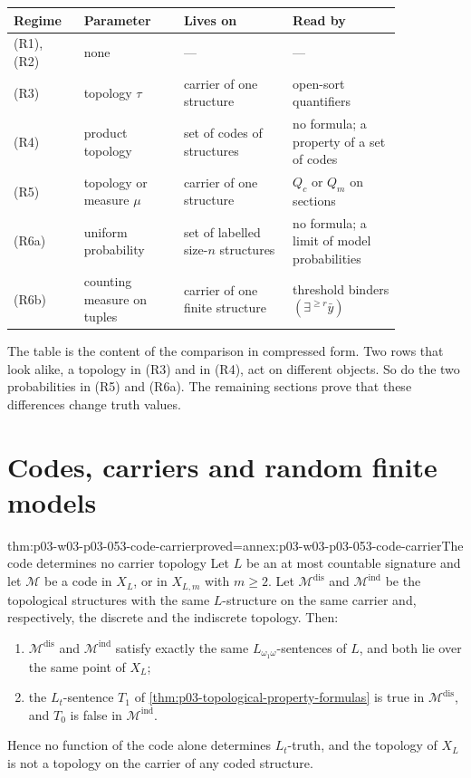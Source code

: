 \begin{center}
\small
\begin{tabular}{@{}p{0.15\linewidth}p{0.22\linewidth}p{0.24\linewidth}p{0.24\linewidth}@{}}
\hline
Regime & Parameter & Lives on & Read by \\
\hline
(R1), (R2) & none & --- & --- \\
(R3) & topology \(\tau\) & carrier of one structure & open-sort quantifiers \\
(R4) & product topology & set of codes of structures & no formula; a property of a set of codes \\
(R5) & topology or measure \(\mu\) & carrier of one structure & \(Q_c\) or \(Q_m\) on sections \\
(R6a) & uniform probability & set of labelled size-\(n\) structures & no formula; a limit of model probabilities \\
(R6b) & counting measure on tuples & carrier of one finite structure & threshold binders \((\exists^{\ge r}\bar y)\) \\
\hline
\end{tabular}
\end{center}

The table is the content of the comparison in compressed form. Two
rows that look alike, a topology in (R3) and in (R4), act on different
objects. So do the two probabilities in (R5) and (R6a).
The remaining sections prove that these differences change truth values.

\section{Codes, carriers and random finite models}
\label{sec:p03-w03-p03-053-codes-carriers}

\begin{hbtheorem}{thm:p03-w03-p03-053-code-carrier}{proved=annex:p03-w03-p03-053-code-carrier}{The code determines no carrier topology}
Let \(L\) be an at most countable signature and let \(\mathcal M\) be a
code in \(X_L\), or in \(X_{L,m}\) with \(m\ge2\). Let
\(\mathcal M^{\mathrm{dis}}\) and \(\mathcal M^{\mathrm{ind}}\) be the
topological structures with the same \(L\)-structure on the same
carrier and, respectively, the discrete and the indiscrete topology.
Then:
\begin{enumerate}
\item \(\mathcal M^{\mathrm{dis}}\) and \(\mathcal M^{\mathrm{ind}}\)
  satisfy exactly the same \(L_{\omega_1\omega}\)-sentences of \(L\),
  and both lie over the same point of \(X_L\);
\item the \(L_t\)-sentence \(T_1\) of
  \cref{thm:p03-topological-property-formulas} is true in
  \(\mathcal M^{\mathrm{dis}}\), and \(T_0\) is false in
  \(\mathcal M^{\mathrm{ind}}\).
\end{enumerate}
Hence no function of the code alone determines \(L_t\)-truth, and the
topology of \(X_L\) is not a topology on the carrier of any coded
structure.
\end{hbtheorem}

